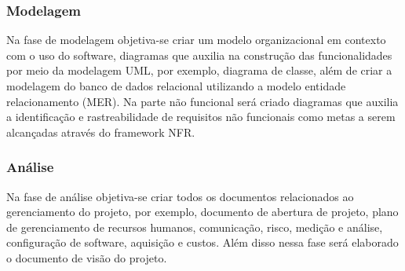 \subsubsection{Modelagem}

Na fase de modelagem objetiva-se criar um modelo organizacional em contexto com o uso do software, diagramas que auxilia na construção das funcionalidades por meio da modelagem UML, por exemplo, diagrama de classe, além de criar a modelagem do banco de dados relacional utilizando a modelo entidade relacionamento (MER). Na parte não funcional será criado diagramas que auxilia a identificação e rastreabilidade de requisitos não funcionais como metas a serem alcançadas através do framework NFR.

\subsubsection{Análise}

Na fase de análise objetiva-se criar todos os documentos relacionados ao gerenciamento do projeto, por exemplo, documento de abertura de projeto, plano de gerenciamento de recursos humanos, comunicação, risco, medição e análise, configuração de software, aquisição e custos. Além disso nessa fase será elaborado o documento de visão do projeto.
